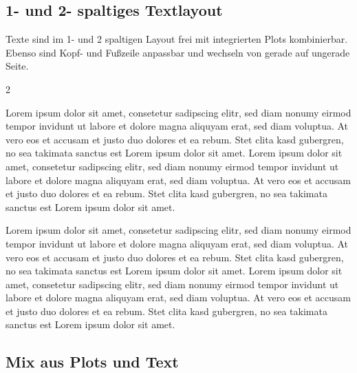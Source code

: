 \documentclass[
  a4paper,
  twoside]{article}
\begin{document}
\newpage

\hypertarget{und-2--spaltiges-textlayout}{%
\subsection{1- und 2- spaltiges Textlayout}\label{und-2--spaltiges-textlayout}}

Texte sind im 1- und 2 spaltigen Layout frei mit integrierten Plots kombinierbar. Ebenso sind Kopf- und Fußzeile anpassbar und wechseln von gerade auf ungerade Seite.

\begin {multicols}{2}

Lorem ipsum dolor sit amet, consetetur sadipscing elitr, sed diam nonumy eirmod tempor invidunt ut labore et dolore magna aliquyam erat, sed diam voluptua. At vero eos et accusam et justo duo dolores et ea rebum. Stet clita kasd gubergren, no sea takimata sanctus est Lorem ipsum dolor sit amet. Lorem ipsum dolor sit amet, consetetur sadipscing elitr, sed diam nonumy eirmod tempor invidunt ut labore et dolore magna aliquyam erat, sed diam voluptua. At vero eos et accusam et justo duo dolores et ea rebum. Stet clita kasd gubergren, no sea takimata sanctus est Lorem ipsum dolor sit amet.

\columnbreak

Lorem ipsum dolor sit amet, consetetur sadipscing elitr, sed diam nonumy eirmod tempor invidunt ut labore et dolore magna aliquyam erat, sed diam voluptua. At vero eos et accusam et justo duo dolores et ea rebum. Stet clita kasd gubergren, no sea takimata sanctus est Lorem ipsum dolor sit amet. Lorem ipsum dolor sit amet, consetetur sadipscing elitr, sed diam nonumy eirmod tempor invidunt ut labore et dolore magna aliquyam erat, sed diam voluptua. At vero eos et accusam et justo duo dolores et ea rebum. Stet clita kasd gubergren, no sea takimata sanctus est Lorem ipsum dolor sit amet.

\end {multicols}

\newpage

\hypertarget{mix-aus-plots-und-text}{%
\subsection{Mix aus Plots und Text}\label{mix-aus-plots-und-text}}
\end{document}
